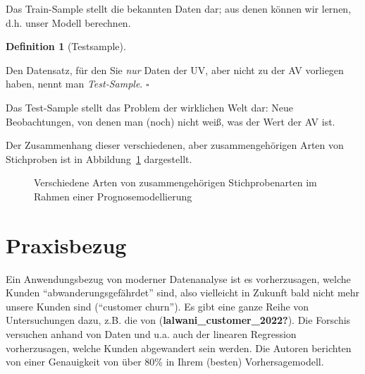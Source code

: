\documentclass[
  a4paper,
]{scrbook}
\theoremstyle{definition}
\theoremstyle{definition}
\newtheorem{definition}{Definition}[chapter]
\theoremstyle{definition}
\theoremstyle{remark}
\begin{document}
Das Train-Sample stellt die bekannten Daten dar; aus denen können wir
lernen, d.h. unser Modell berechnen.

\begin{definition}[Testsample]\protect\hypertarget{def-testsample}{}\label{def-testsample}

Den Datensatz, für den Sie \emph{nur} Daten der UV, aber nicht zu der AV
vorliegen haben, nennt man \emph{Test-Sample}. \(\square\)

\end{definition}

Das Test-Sample stellt das Problem der wirklichen Welt dar: Neue
Beobachtungen, von denen man (noch) nicht weiß, was der Wert der AV ist.

Der Zusammenhang dieser verschiedenen, aber zusammengehörigen Arten von
Stichproben ist in Abbildung~\ref{fig-sample-types} dargestellt.

\begin{figure}


\caption{\label{fig-sample-types}Verschiedene Arten von
zusammengehörigen Stichprobenarten im Rahmen einer Prognosemodellierung}

\end{figure}%

\section{Praxisbezug}\label{praxisbezug-4}

Ein Anwendungsbezug von moderner Datenanalyse ist es vorherzusagen,
welche Kunden ``abwanderungsgefährdet'' sind, also vielleicht in Zukunft
bald nicht mehr unsere Kunden sind (``customer churn''). Es gibt eine
ganze Reihe von Untersuchungen dazu, z.B. die von
(\textbf{lalwani\_customer\_2022?}). Die Forschis versuchen anhand von
Daten und u.a. auch der linearen Regression vorherzusagen, welche Kunden
abgewandert sein werden. Die Autoren berichten von einer Genauigkeit von
über 80\% in Ihrem (besten) Vorhersagemodell.
\end{document}
